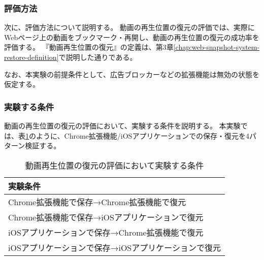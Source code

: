 \subsubsection{評価方法}
次に、評価方法について説明する。
動画の再生位置の復元の評価では、実際にWebページ上の動画をブックマーク・再開し、動画の再生位置の復元の成功率を評価する。
『動画再生位置の復元』の定義は、第3章\ref{chap:web-snapshot-system-restore-definition}で説明した通りである。

なお、本実験の前提条件として、広告ブロッカーなどの拡張機能は無効の状態を仮定する。

\subsubsection{実験する条件}
動画の再生位置の復元の評価において、実験する条件を説明する。
本実験では、表\ref{tb:evl-video-audio-conditions}のように、Chrome拡張機能/iOSアプリケーションでの保存・復元を4パターン検証する。

\begin{table}[htbp]
  \label{tb:evl-video-audio-conditions}
  \caption{動画再生位置の復元の評価において実験する条件}
  \begin{center}
    \begin{tabular}{|l|}
    \hline
    実験条件  \\\hline\hline
    Chrome拡張機能で保存→Chrome拡張機能で復元 \\ \hline
    Chrome拡張機能で保存→iOSアプリケーションで復元 \\ \hline
    iOSアプリケーションで保存→Chrome拡張機能で復元 \\ \hline
    iOSアプリケーションで保存→iOSアプリケーションで復元 \\ \hline
    \end{tabular}
  \end{center}
\end{table}
